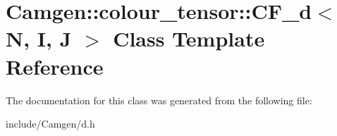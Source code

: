 \hypertarget{a00034}{\section{Camgen\-:\-:colour\-\_\-tensor\-:\-:C\-F\-\_\-d$<$ N, I, J $>$ Class Template Reference}
\label{a00034}
}


The documentation for this class was generated from the following file\-:\begin{DoxyCompactItemize}
\item 
include/\-Camgen/d.\-h\end{DoxyCompactItemize}
